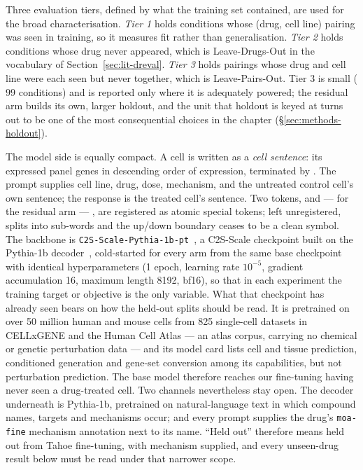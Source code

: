 Three evaluation tiers, defined by what the training set contained, are used for the broad
characterisation. \emph{Tier 1} holds conditions whose (drug, cell line) pairing was seen in
training, so it measures fit rather than generalisation. \emph{Tier 2} holds conditions whose drug
never appeared, which is Leave-Drugs-Out in the vocabulary of Section~\ref{sec:lit-dreval}.
\emph{Tier 3} holds pairings whose drug and cell line were each seen but never together, which is
Leave-Pairs-Out. Tier 3 is small ($99$ conditions) and is reported only where it is adequately
powered; the residual arm builds its own, larger holdout, and the unit that holdout is keyed at
turns out to be one of the most consequential choices in the chapter (\S\ref{sec:methods-holdout}).

The model side is equally compact. A cell is written as a \emph{cell sentence}: its expressed panel
genes in descending order of expression, terminated by \ENDCELL. The prompt supplies cell line,
drug, dose, mechanism, and the untreated control cell's own sentence; the response is the treated
cell's sentence. Two tokens, \ENDCELL{} and --- for the residual arm --- \DOWN{}, are registered as
atomic special tokens; left unregistered, \DOWN{} splits into sub-words and the up/down boundary
ceases to be a clean symbol. The backbone is \texttt{C2S-Scale-Pythia-1b-pt}~\cite{c2sscale}, a
C2S-Scale checkpoint built on the Pythia-1b decoder~\cite{pythia}, cold-started for every arm from
the same base checkpoint with identical hyperparameters (1 epoch, learning rate $10^{-5}$, gradient
accumulation 16, maximum length 8192, bf16), so that in each experiment the training target or
objective is the only variable. What that checkpoint has already seen bears on how the held-out
splits should be read. It is pretrained on over 50 million human and mouse cells from 825
single-cell datasets in CELLxGENE and the Human Cell Atlas --- an atlas corpus, carrying no chemical
or genetic perturbation data --- and its model card lists cell and tissue prediction, conditioned
generation and gene-set conversion among its capabilities, but not perturbation prediction. The base
model therefore reaches our fine-tuning having never seen a drug-treated cell. Two channels
nevertheless stay open. The decoder underneath is Pythia-1b, pretrained on natural-language text in
which compound names, targets
and mechanisms occur; and every prompt supplies the drug's \texttt{moa-fine} mechanism annotation next
to its name. ``Held out'' therefore means held out from Tahoe fine-tuning, with mechanism supplied, and
every unseen-drug result below must be read under that narrower scope.

